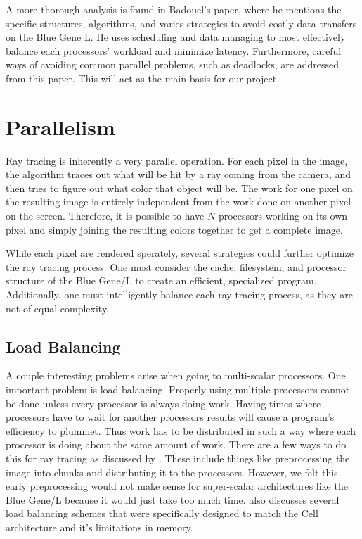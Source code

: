 \documentclass{acmsiggraph}
\begin{document}
A more thorough analysis is found in Badouel's paper, where he mentions the
specific structures, algorithms, and varies strategies to avoid costly data
transfers on the Blue Gene L.  He uses scheduling and data managing to most
effectively balance each processors' workload and minimize latency.  Furthermore,
careful ways of avoiding common parallel problems, such as deadlocks, are
addressed from this paper.  This will act as the main basis for our project. 
\cite{badouel1994dda}

\section{Parallelism}
Ray tracing is inherently a very parallel operation. For each pixel in the
image, the algorithm traces out what will be hit by a ray coming from the
camera, and then tries to figure out what color that object will be. The work
for one pixel on the resulting image is entirely independent from the work done
on another pixel on the screen. Therefore, it is possible to have $N$ processors
working on its own pixel and simply joining the resulting colors together to get
a complete image.

While each pixel are rendered sperately, several strategies could further
optimize the ray tracing process. One must consider the cache,
filesystem, and processor structure of the Blue Gene/L to create an efficient,
specialized program.  Additionally, one must intelligently balance each ray tracing
process, as they are not of equal complexity.


\subsection{Load Balancing}
A couple interesting problems arise when going to multi-scalar processors. One
important problem is load balancing. Properly using multiple processors cannot
be done unless every processor is always doing work.  Having times where
processors have to wait for another processors results will cause a program's
efficiency to plummet. Thus work has to be distributed in such a way where each
processor is doing about the same amount of work. There are a few ways to do
this for ray tracing as discussed by \cite{badouel1994dda}. These include things
like preprocessing the image into chunks and distributing it to the processors.
However, we felt this early preprocessing would not make sense for super-scalar
architectures like the Blue Gene/L because it would just take too much time.
\cite{benthin2006rtc} also discusses several load balancing schemes that were
specifically designed to match the Cell architecture and it's limitations in
memory.
\end{document}
